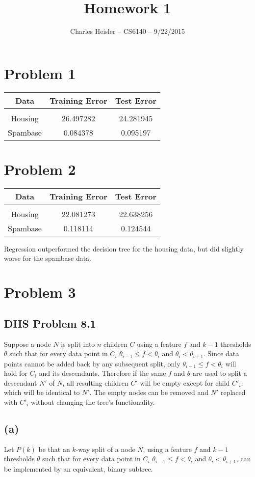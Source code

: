 \documentclass[12pt]{article}
\title{Homework 1}
\author{Charles Heisler -- CS6140 -- 9/22/2015}
\date{}
\begin{document}
\maketitle

\section*{Problem 1}
	\begin{tabular}{c | c | c}
		Data & Training Error & Test Error \\
		\hline & & \\
		Housing & 26.497282 & 24.281945 \\
		Spambase & 0.084378 & 0.095197
	\end{tabular}
	
\section*{Problem 2}
	\begin{tabular}{c | c | c}
		Data & Training Error & Test Error \\
		\hline & & \\
		Housing & 22.081273 & 22.638256 \\
		Spambase & 0.118114 & 0.124544
	\end{tabular}
	
	Regression outperformed the decision tree for the housing data, but did slightly worse for the spambase data.
	
\section*{Problem 3}
	\subsection*{DHS Problem 8.1}
		Suppose a node $N$ is split into $n$ children $C$ using a feature $f$ and $k-1$ thresholds $\theta$ such that for every data point in $C_i$ $\theta_{i-1} \leq f < \theta_i$ and $\theta_i < \theta_{i+1}$. Since data points cannot be added back by any subsequent split, only $\theta_{i-1} \leq f < \theta_i$ will hold for $C_i$ and its descendants. Therefore if the same $f$ and $\theta$ are used to split a descendant $N'$ of $N$, all resulting children $C'$ will be empty except for child $C'_i$, which will be identical to $N'$. The empty nodes can be removed and $N'$ replaced with $C'_i$ without changing the tree's functionality.

	\subsection*{(a)}
	Let $P(k)$ be that an $k$-way split of a node $N$, using a feature $f$ and $k-1$ thresholds $\theta$ such that for every data point in $C_i$ $\theta_{i-1} \leq f < \theta_i$ and $\theta_i < \theta_{i+1}$, can be implemented by an equivalent, binary subtree.
	
\end{document}
